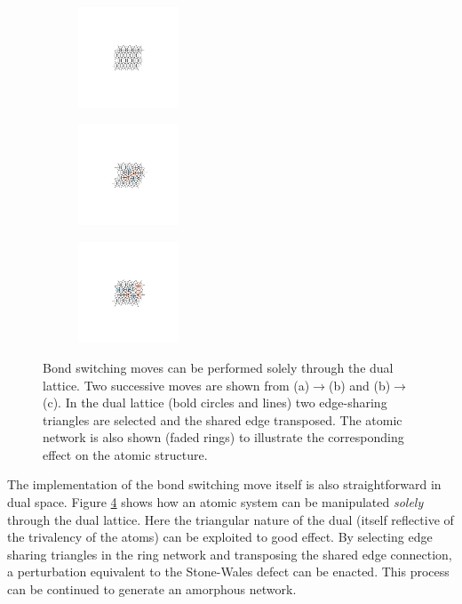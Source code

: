 \begin{figure}[bt]
     \centering
     
     \begin{subfigure}[b]{0.3\textwidth}
         \centering
         \includegraphics[height=3cm]{./figures/targeted_opt/dualswitch_0.pdf}
         \caption{}
         \label{fig:dualswitch1}
     \end{subfigure}
     \hfill
	\begin{subfigure}[b]{0.3\textwidth}
         \centering
         \includegraphics[height=3cm]{./figures/targeted_opt/dualswitch_1.pdf}
         \caption{}
         \label{fig:dualswitch2}
     \end{subfigure}
     \hfill
     \begin{subfigure}[b]{0.3\textwidth}
         \centering
         \includegraphics[height=3cm]{./figures/targeted_opt/dualswitch_2.pdf}
         \caption{}
         \label{fig:dualswitch3}
     \end{subfigure}

     \caption{Bond switching \mc{} moves can be performed solely through the dual lattice. Two successive moves are shown from (a)$\rightarrow$(b) and (b)$\rightarrow$(c). In the dual lattice (bold circles and lines) two edge\--sharing triangles are selected and the shared edge transposed. The atomic network is also shown (faded rings) to illustrate the corresponding effect on the atomic structure.}
     \label{fig:dualswitch}
\end{figure}

The implementation of the bond switching move itself is also straightforward in dual space.
Figure \ref{fig:dualswitch} shows how an atomic system can be manipulated \textit{solely} through the dual lattice.
Here the triangular nature of the dual (itself reflective of the trivalency of the atoms) can be exploited to good effect.
By selecting edge sharing triangles in the ring network and transposing the shared edge connection, a perturbation equivalent to the Stone\--Wales defect can be enacted. 
This process can be continued to generate an amorphous network. 

